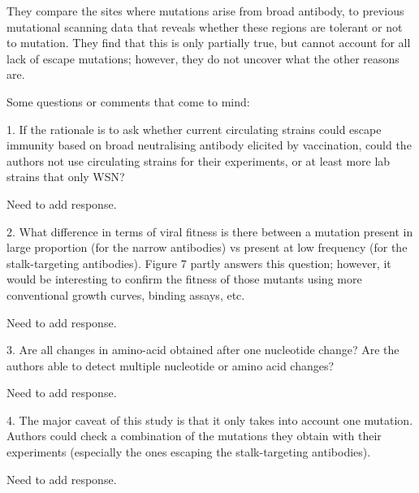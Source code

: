 \documentclass[11pt, oneside]{article}   	%
\begin{document}
They compare the sites where mutations arise from broad antibody, to previous mutational scanning data that reveals whether these regions are tolerant or not to mutation. They find that this is only partially true, but cannot account for all lack of escape mutations; however, they do not uncover what the other reasons are.

Some questions or comments that come to mind:

1. If the rationale is to ask whether current circulating strains could escape immunity based on broad neutralising antibody elicited by vaccination, could the authors not use circulating strains for their experiments, or at least more lab strains that only WSN?

{\color{red}
Need to add response.}

2. What difference in terms of viral fitness is there between a mutation present in large proportion (for the narrow antibodies) vs present at low frequency (for the stalk-targeting antibodies). Figure 7 partly answers this question; however, it would be interesting to confirm the fitness of those mutants using more conventional growth curves, binding assays, etc.

{\color{red}
Need to add response.}

3. Are all changes in amino-acid obtained after one nucleotide change? Are the authors able to detect multiple nucleotide or amino acid changes?

{\color{red}
Need to add response.}

4. The major caveat of this study is that it only takes into account one mutation. Authors could check a combination of the mutations they obtain with their experiments (especially the ones escaping the stalk-targeting antibodies).

{\color{red}
Need to add response.}
\end{document}
